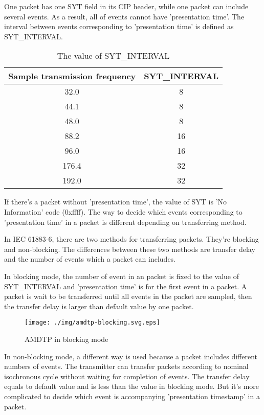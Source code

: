 \documentclass[onecolumn]{article}
\begin{document}
One packet has one SYT field in its CIP header, while one packet can include several events. As a result, all of events cannot have 'presentation time'. The interval between events corresponding to 'presentation time' is defined as SYT\_INTERVAL.

\begin{table}[ht]
	\centering
	\caption{{The value of SYT\_INTERVAL}}
	\label{syt_interval}
	\begin{tabular}{cc} \toprule
		Sample transmission frequency & SYT\_INTERVAL \\ \midrule
		32.0	& 8	\\
		44.1	& 8	\\
		48.0	& 8	\\
		88.2	& 16	\\
		96.0	& 16	\\
		176.4	& 32	\\
		192.0	& 32	\\ \bottomrule
	\end{tabular}
\end{table}

If there's a packet without 'presentation time', the value of SYT is 'No Information' code (0xffff). The way to decide which events corresponding to 'presentation time' in a packet is different depending on transferring method.

In IEC 61883-6\cite{iec61883-6-1,iec61883-6-2}, there are two methods for transferring packets. They're blocking and non-blocking. The differences between these two methods are transfer delay and the number of events which a packet can includes.

In blocking mode, the number of event in an packet is fixed to the value of SYT\_INTERVAL and 'presentation time' is for the first event in a packet. A packet is wait to be transferred until all events in the packet are sampled, then the transfer delay is larger than default value by one packet.

\begin{figure}[H]
	\centering
	\texttt{[image: ./img/amdtp-blocking.svg.eps]}
	\caption{{AMDTP in blocking mode}}
	\label{amdtp-blocking}
\end{figure}

In non-blocking mode, a different way is used because a packet includes different numbers of events. The transmitter can transfer packets according to nominal isochronous cycle without waiting for completion of events. The transfer delay equals to default value and is less than the value in blocking mode. But it's more complicated to decide which event is accompanying 'presentation timestamp' in a packet.
\end{document}
